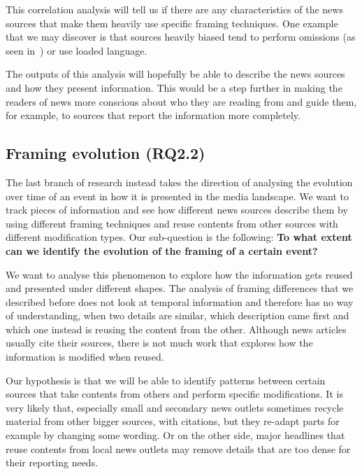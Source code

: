 
This correlation analysis will tell us if there are any characteristics of the news sources that make them heavily use specific framing techniques.
One example that we may discover is that sources heavily biased tend to perform omissions (as seen in~\citet{bountouridis2018explaining}) or use loaded language.


The outputs of this analysis will hopefully be able to describe the news sources and how they present information.
This would be a step further in making the readers of news more conscious about who they are reading from and guide them, for example, to sources that report the information more completely.


\subsection{Framing evolution (RQ2.2)}
The last branch of research instead takes the direction of analysing the evolution over time of an event in how it is presented in the media landscape.
We want to track pieces of information and see how different news sources describe them by using different framing techniques and reuse contents from other sources with different modification types.
Our sub-question is the following: \textbf{To what extent can we identify the evolution of the framing of a certain event?}

We want to analyse this phenomenon to explore how the information gets reused and presented under different shapes.
The analysis of framing differences that we described before does not look at temporal information and therefore has no way of understanding, when two details are similar, which description came first and which one instead is reusing the content from the other.
Although news articles usually cite their sources, there is not much work that explores how the information is modified when reused.


Our hypothesis is that we will be able to identify patterns between certain sources that take contents from others and perform specific modifications.
It is very likely that, especially small and secondary news outlets sometimes recycle material from other bigger sources, with citations, but they re-adapt parts for example by changing some wording.
Or on the other side, major headlines that reuse contents from local news outlets may remove details that are too dense for their reporting needs.

